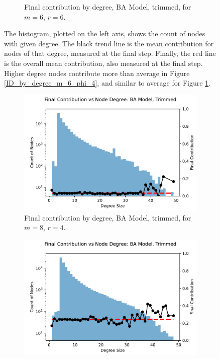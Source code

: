 \begin{figure}[!h]
\begin{subfigure}[b]{0.45\textwidth}
    \caption{Final contribution by degree, BA Model, trimmed, for $m=6$, $r=6$. }
    \label{ID_by_degree_m_6_phi_6}
  \end{subfigure}
  \caption{The histogram, plotted on the left axis, shows the count of nodes with given degree. The black trend line is the mean contribution for nodes of that degree, measured at the final step. Finally, the red line is the overall mean contribution, also measured at the final step. Higher degree nodes contribute more than average in Figure \ref{ID_by_degree_m_6_phi_4}, and similar to average for Figure \ref{ID_by_degree_m_6_phi_6}. } \label{ID_by_degree_m_6}
\end{figure} 
\FloatBarrier


\FloatBarrier 
\begin{figure}[!h]
  \begin{subfigure}[b]{0.45\textwidth}
    \includegraphics[width=1.1\textwidth]{images/ID_BA_node_groups_m_8_phi_4_trimmed.pdf}
    \caption{Final contribution by degree, BA Model, trimmed, for $m=8$, $r=4$.   }
    \label{ID_by_degree_m_8_phi_4}
  \end{subfigure}
  \hfill
  \begin{subfigure}[b]{0.45\textwidth}
    \includegraphics[width=1.1\textwidth]{images/ID_BA_node_groups_m_8_phi_6_trimmed.pdf}

\end{subfigure}
\end{figure}
